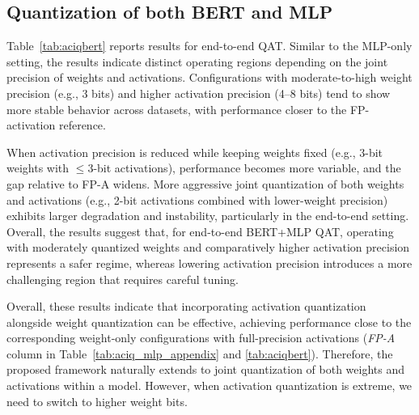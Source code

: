 \documentclass{article}
\theoremstyle{definition}
\theoremstyle{remark}
\begin{document}
\subsection{Quantization of both BERT and MLP}
Table~\ref{tab:aciqbert} reports results for end-to-end QAT. Similar to the MLP-only setting, the results indicate distinct operating regions depending on the joint precision of weights and activations. 
Configurations with moderate-to-high weight precision (e.g., 3 bits) and higher activation precision (4–8 bits) tend to show more stable behavior across datasets, with performance closer to the FP-activation reference. 

When activation precision is reduced while keeping weights fixed (e.g., 3-bit weights with $\le$3-bit activations), performance becomes more variable, and the gap relative to FP-A widens. 
More aggressive joint quantization of both weights and activations (e.g., 2-bit activations combined with lower-weight precision) exhibits larger degradation and instability, particularly in the end-to-end setting. 
Overall, the results suggest that, for end-to-end BERT+MLP QAT, operating with moderately quantized weights and comparatively higher activation precision represents a safer regime, whereas lowering activation precision introduces a more challenging region that requires careful tuning.

Overall, these results indicate that incorporating activation quantization alongside weight quantization can be effective, achieving performance close to the corresponding weight-only configurations with full-precision activations (\textit{FP-A} column in Table~\ref{tab:aciq_mlp_appendix} and \ref{tab:aciqbert}). Therefore, the proposed framework naturally extends to joint quantization of both weights and activations within a model. However, when activation quantization is extreme, we need to switch to higher weight bits.
\end{document}
